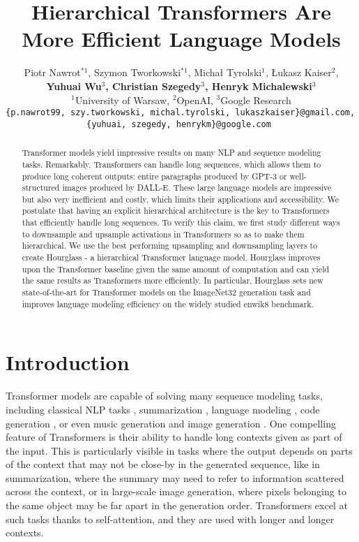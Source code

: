 \documentclass[11pt]{article}
\title{Hierarchical Transformers Are More Efficient Language Models}
\author{Piotr Nawrot$^{*1}$, Szymon Tworkowski$^{*1}$, Michał Tyrolski$^1$, Łukasz Kaiser$^2$, \\
	{\bf Yuhuai Wu$^3$, Christian Szegedy$^3$, Henryk Michalewski$^3$ }\\
	$^1$University of Warsaw, $^2$OpenAI, $^3$Google Research \\
	{\small \texttt{\{p.nawrot99, szy.tworkowski, michal.tyrolski, lukaszkaiser\}@gmail.com, }} 
	\\
	{\small \texttt{\{yuhuai, szegedy, henrykm\}@google.com }}
}
\begin{document}
\maketitle

\renewcommand{\thefootnote}{\fnsymbol{footnote}}
\renewcommand{\thefootnote}{\arabic{footnote}}

\begin{abstract}
 Transformer models yield impressive results on many NLP and sequence modeling tasks. Remarkably, Transformers can handle long sequences, which allows them to produce long coherent outputs: entire paragraphs produced by GPT-3 or well-structured images produced by DALL-E. These large language models are impressive but also very inefficient and costly, which limits their applications and accessibility. We postulate that having an explicit hierarchical architecture is the key to Transformers that efficiently handle long sequences. To verify this claim, we first study different ways to downsample and upsample activations in Transformers so as to make them hierarchical. We use the best performing upsampling and downsampling layers to create Hourglass - a hierarchical Transformer language model. Hourglass improves upon the Transformer baseline given the same amount of computation and can yield the same results as Transformers more efficiently. In particular, Hourglass sets new state-of-the-art for Transformer models on the ImageNet32 generation task and improves language modeling efficiency on the widely studied enwik8 benchmark.
\end{abstract}

\section{Introduction}

Transformer models \cite{vaswani2017attention} are capable of
solving many sequence modeling tasks, including classical NLP
tasks \cite{devlin2019bert}, summarization \cite{zhang2020pegasus}, language modeling \cite{radford2019language, brown2020language}, code generation \cite{chen2021evaluating}, or even music generation \cite{huang2018music, dhariwal2020jukebox} and image generation \cite{parmar2018image, pmlr-v119-chen20s, ramesh2021zeroshot}.
One compelling feature of Transformers is their ability
to handle long contexts given as part of the input. This is particularly visible in tasks where the output depends on parts of the context that may not be close-by in the generated sequence, like in
summarization, where the summary may need to refer to information scattered across the context, or in large-scale image generation, where pixels belonging to the same object may be far apart in the generation order. Transformers excel at such tasks thanks to self-attention, and they are used with longer and longer contexts. 
\end{document}
